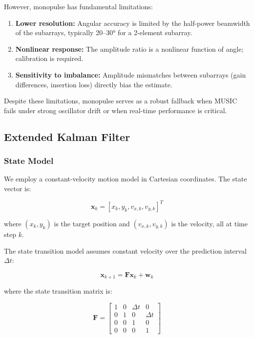 \documentclass[10pt,a4paper]{article}
\begin{document}
However, monopulse has fundamental limitations:

\begin{enumerate}
\item \textbf{Lower resolution:} Angular accuracy is limited by the half-power beamwidth of the subarrays,
  typically 20--30° for a 2-element subarray.
\item \textbf{Nonlinear response:} The amplitude ratio is a nonlinear function of angle; calibration is required.
\item \textbf{Sensitivity to imbalance:} Amplitude mismatches between subarrays (gain differences, insertion loss)
  directly bias the estimate.
\end{enumerate}

Despite these limitations, monopulse serves as a robust fallback when MUSIC fails under strong oscillator drift
or when real-time performance is critical.

\subsection{Extended Kalman Filter}

\subsubsection{State Model}

We employ a constant-velocity motion model in Cartesian coordinates. The state vector is:

\begin{equation}
\mathbf{x}_k = [x_k, y_k, v_{x,k}, v_{y,k}]^T
\label{eq:state_vector}
\end{equation}

where $(x_k, y_k)$ is the target position and $(v_{x,k}, v_{y,k})$ is the velocity, all at time step $k$.

The state transition model assumes constant velocity over the prediction interval $\Delta t$:

\begin{equation}
\mathbf{x}_{k+1} = \mathbf{F} \mathbf{x}_k + \mathbf{w}_k
\label{eq:state_transition}
\end{equation}

where the state transition matrix is:

\begin{equation}
\mathbf{F} = \begin{bmatrix} 1 & 0 & \Delta t & 0 \\ 0 & 1 & 0 & \Delta t \\ 0 & 0 & 1 & 0 \\ 0 & 0 & 0 & 1 \end{bmatrix}
\label{eq:transition_matrix}
\end{equation}
\end{document}
